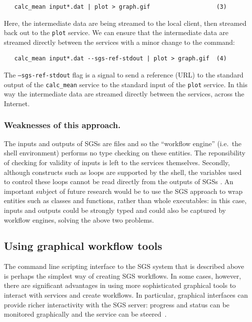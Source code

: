 \documentclass{article}
\begin{document}
\begin{verbatim}
   calc_mean input*.dat | plot > graph.gif                   (3)
\end{verbatim}

Here, the intermediate data are being streamed to the local client, then streamed back out to the {\tt plot} service.  We can ensure that the intermediate data are streamed directly between the services with a minor change to the command:

\begin{verbatim}
   calc_mean input*.dat --sgs-ref-stdout | plot > graph.gif  (4)
\end{verbatim}

The {\tt --sgs-ref-stdout} flag is a signal to send a reference (URL) to the standard output of the {\tt calc\_mean} service to the standard input of the {\tt plot} service.  In this way the intermediate data are streamed directly between the services, across the Internet.

\subsubsection{Weaknesses of this approach.}
The inputs and outputs of SGSs are files and so the ``workflow engine'' (i.e.\ the shell environment) performs no type checking on these entities.  The reponsibility of checking for validity of inputs is left to the services themselves.  Secondly, although constructs such as loops are supported by the shell, the variables used to control these loops cannot be read directly from the outputs of SGSs%
.  An important subject of future research would be to use the SGS approach to wrap entities such as classes and functions, rather than whole executables: in this case, inputs and outputs could be strongly typed and could also be captured by workflow engines, solving the above two problems.

\subsection{Using graphical workflow tools}\label{subsec:graphical-workflow}
The command line scripting interface to the SGS system that is described above is perhaps the simplest way of creating SGS workflows.  In some cases, however, there are significant advantages in using more sophisticated graphical tools to interact with services and create workflows.  In particular, graphical interfaces can provide richer interactivity with the SGS server: progress and status can be monitored graphically %
and the service can be steered~\cite{blower:2005}.
\end{document}

